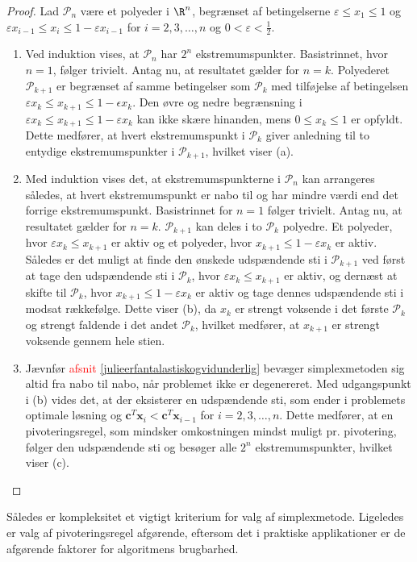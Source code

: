 \begin{proof}
%
Lad $\mathcal{P}_n$ være et polyeder i $\R^n$, begrænset af betingelserne $\varepsilon \leq x_1 \leq 1$ og $\varepsilon x_{i-1} \leq x_i \leq 1 - \varepsilon x_{i-1}$ for $i = 2, 3, \ldots, n$ og $0 < \varepsilon < \frac{1}{2}$.
%
\begin{enumerate}[label = (\alph*)]
\item Ved induktion vises, at $\mathcal{P}_n$ har $2^n$ ekstremumspunkter. 
Basistrinnet, hvor $n=1$, følger trivielt.
Antag nu, at resultatet gælder for $n=k$.
Polyederet $\mathcal{P}_{k+1}$ er begrænset af samme betingelser som $\mathcal{P}_{k}$ med tilføjelse af betingelsen $\varepsilon x_{k} \leq x_{k+1} \leq 1 - \epsilon x_{k}$.
Den øvre og nedre begrænsning i $\varepsilon x_{k} \leq x_{k+1} \leq 1 - \varepsilon x_{k}$ kan ikke skære hinanden, mens $ 0 \leq x_k \leq 1$ er opfyldt.
Dette medfører, at hvert ekstremumspunkt i $\mathcal{P}_{k}$ giver anledning til to entydige ekstremumspunkter i $\mathcal{P}_{k+1}$, hvilket viser (a).
\item Med induktion vises det, at ekstremumspunkterne i $\mathcal{P}_n$ kan arrangeres således, at hvert ekstremumspunkt er nabo til og har mindre værdi end det forrige ekstremumspunkt.
Basistrinnet for $n=1$ følger trivielt.
Antag nu, at resultatet gælder for  $n = k$.
$\mathcal{P}_{k+1}$ kan deles i to $\mathcal{P}_{k}$ polyedre.
Et polyeder, hvor $\varepsilon x_{k} \leq x_{k+1}$ er aktiv og et polyeder, hvor $x_{k+1} \leq 1 - \varepsilon x_{k}$ er aktiv.
Således er det muligt at finde den ønskede udspændende sti i $\mathcal{P}_{k+1}$ ved først at tage den udspændende sti i $\mathcal{P}_{k}$, hvor $\varepsilon x_{k} \leq x_{k+1}$ er aktiv, og dernæst at skifte til $\mathcal{P}_{k}$, hvor $x_{k+1} \leq 1 - \varepsilon x_{k}$ er aktiv og tage dennes udspændende sti i modsat rækkefølge.
Dette viser (b), da $x_k$ er strengt voksende i det første $\mathcal{P}_{k}$ og strengt faldende i det andet $\mathcal{P}_{k}$, hvilket medfører, at $x_{k+1}$ er strengt voksende gennem hele stien.
%
\item Jævnfør \textcolor{red}{afsnit \ref{julieerfantalastiskogvidunderlig}} bevæger simplexmetoden sig altid fra nabo til nabo, når problemet ikke er degenereret.
Med udgangspunkt i (b) vides det, at der eksisterer en udspændende sti, som ender i problemets optimale løsning og $\textbf{c}^T\textbf{x}_i < \textbf{c}^T\textbf{x}_{i-1}$ for $i = 2, 3, \ldots ,n$.
Dette medfører, at en pivoteringsregel, som mindsker omkostningen mindst muligt pr. pivotering, følger den udspændende sti og besøger alle $2^n$ ekstremumspunkter, hvilket viser (c).
\end{enumerate}
\end{proof}
%
Således er kompleksitet et vigtigt kriterium for valg af simplexmetode.
Ligeledes er valg af pivoteringsregel afgørende, eftersom det i praktiske applikationer er de afgørende faktorer for algoritmens brugbarhed.
